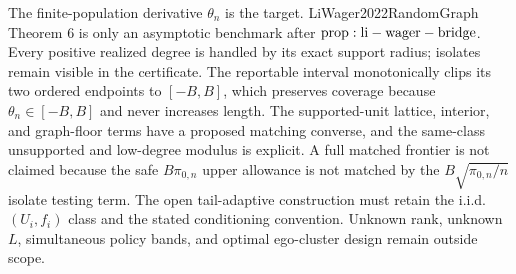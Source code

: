 The finite-population derivative \(\theta_n\) is the target. LiWager2022RandomGraph Theorem 6 is only an asymptotic benchmark after \({\rm prop:li-wager-bridge}\). Every positive realized degree is handled by its exact support radius; isolates remain visible in the certificate. The reportable interval monotonically clips its two ordered endpoints to \([-B,B]\), which preserves coverage because \(\theta_n\in[-B,B]\) and never increases length. The supported-unit lattice, interior, and graph-floor terms have a proposed matching converse, and the same-class unsupported and low-degree modulus is explicit. A full matched frontier is not claimed because the safe \(B\pi_{0,n}\) upper allowance is not matched by the \(B\sqrt{\pi_{0,n}/n}\) isolate testing term. The open tail-adaptive construction must retain the i.i.d. \((U_i,f_i)\) class and the stated conditioning convention. Unknown rank, unknown \(L\), simultaneous policy bands, and optimal ego-cluster design remain outside scope.